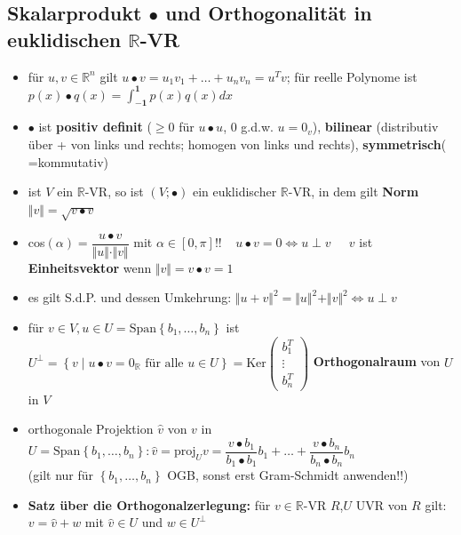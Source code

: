 \documentclass[10pt,a4paper]{article}
\begin{document}
\subsection{Skalarprodukt $\bullet$ und Orthogonalität in euklidischen $\mathbb{R}$-VR}
\begin{itemize}
\item für $u,v \in \mathbb{R}^{n}$ gilt $u\bullet v=u_{1}v_{1}+\dotsc +u_{n}v_{n}=u^{T}v$; für reelle Polynome ist $p(x)\bullet q(x)=\int_{\boldsymbol{-1}}^{\boldsymbol{1}} p(x)q(x) dx$
\item $\bullet$ ist \textbf{positiv definit} ($\geq 0$ für $u\bullet u$, 0 g.d.w. $u=0_{v}$), \textbf{bilinear} (distributiv über + von links und rechts; homogen von links und rechts), \textbf{symmetrisch}( =kommutativ)


\item ist $V$ ein $\mathbb{R}$-VR, so ist $(V;\bullet)$ ein euklidischer $\mathbb{R}$-VR, in dem gilt \textbf{Norm} $\Vert v \Vert=\sqrt{v\bullet v}$ 
\item cos$(\alpha)=\dfrac{u\bullet v}{\Vert u \Vert \cdot \Vert v\Vert}$ mit $\alpha\in [0,\pi]$!!$\;\;\;\; u \bullet v=0 \Leftrightarrow u\perp v$ $\;\;\;\;v$ ist \textbf{Einheitsvektor} wenn $\Vert v \Vert=v\bullet v=1$
\item es gilt S.d.P. und dessen Umkehrung: $\Vert u+v\Vert^2=\Vert u\Vert^2 +\Vert v \Vert^2 \Leftrightarrow u\perp v$


\item für $v\in V,u\in U=\text{Span}\left\lbrace b_{1},\dotsc,b_{n}\right\rbrace$ ist $U^{\perp}=\left\lbrace v\mid u\bullet v=0_{\mathbb{R}}\text{ für alle } u\in U\right\rbrace=\text{Ker}\begin{pmatrix}
b_{1}^{T}\\\vdots\\b_{n}^{T}
\end{pmatrix}$ \textbf{Orthogonalraum} von $U$ in $V$


\item orthogonale Projektion $\hat{v}$ von $v$ in $U=\text{Span}\left\lbrace b_{1},\dotsc,b_{n}\right\rbrace: \hat{v}=\text{proj}_{U}v=\dfrac{v\bullet b_{1}}{b_{1}\bullet b_{1}}b_{1}+\dotsc+\dfrac{v\bullet b_{n}}{b_{n}\bullet b_{n}}b_{n}$\\ 
(gilt nur für $\left\lbrace b_{1},\dotsc,b_{n}\right\rbrace$ OGB, sonst erst Gram-Schmidt anwenden!!) 
\item \textbf{Satz über die Orthogonalzerlegung:} für $v\in \mathbb{R}$-VR $R$,$U$ UVR von $R$ gilt: $v=\hat{v}+w$ mit $\hat{v}\in U$ und $w\in U^{\perp}$
\end{itemize}
\end{document}
